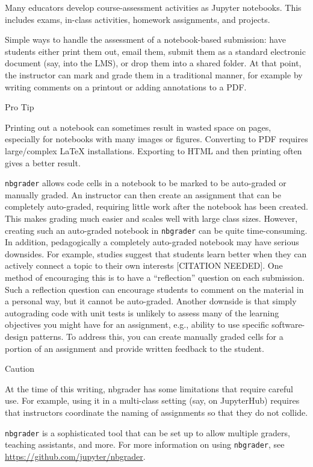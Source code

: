 \documentclass[]{book}
\begin{document}
Many educators develop course-assessment activities as Jupyter
notebooks. This includes exams, in-class activities, homework
assignments, and projects.

Simple ways to handle the assessment of a notebook-based submission:
have students either print them out, email them, submit them as a
standard electronic document (say, into the LMS), or drop them into a
shared folder. At that point, the instructor can mark and grade them in
a traditional manner, for example by writing comments on a printout or
adding annotations to a PDF.

Pro Tip

Printing out a notebook can sometimes result in wasted space on pages,
especially for notebooks with many images or figures. Converting to PDF
requires large/complex LaTeX installations. Exporting to HTML and then
printing often gives a better result.

\texttt{nbgrader} allows code cells in a notebook to be marked to be
auto-graded or manually graded. An instructor can then create an
assignment that can be completely auto-graded, requiring little work
after the notebook has been created. This makes grading much easier and
scales well with large class sizes. However, creating such an
auto-graded notebook in \texttt{nbgrader} can be quite time-consuming.
In addition, pedagogically a completely auto-graded notebook may have
serious downsides. For example, studies suggest that students learn
better when they can actively connect a topic to their own interests
{[}CITATION NEEDED{]}. One method of encouraging this is to have a
``reflection'' question on each submission. Such a reflection question
can encourage students to comment on the material in a personal way, but
it cannot be auto-graded. Another downside is that simply autograding
code with unit tests is unlikely to assess many of the learning
objectives you might have for an assignment, e.g., ability to use
specific software-design patterns. To address this, you can create
manually graded cells for a portion of an assignment and provide written
feedback to the student.

Caution

At the time of this writing, nbgrader has some limitations that require
careful use. For example, using it in a multi-class setting (say, on
JupyterHub) requires that instructors coordinate the naming of
assignments so that they do not collide.

\texttt{nbgrader} is a sophisticated tool that can be set up to allow
multiple graders, teaching assistants, and more. For more information on
using \texttt{nbgrader}, see \url{https://github.com/jupyter/nbgrader}.
\end{document}
